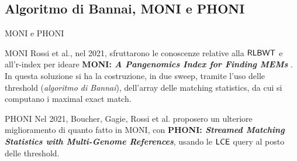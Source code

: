 \documentclass{beamer}
\def\LCE{\mbox{\rm {\sf LCE}}}
\def\RLBWT{\mbox{\rm {\sf RLBWT}}}
\def\LCE{\mbox{\rm {\sf LCE}}}
\begin{document}
\subsection{Algoritmo di Bannai, MONI e PHONI}
\begin{frame}{MONI e PHONI}
  \begin{block}{MONI}
    \small
    Rossi et al., nel 2021, sfruttarono le conoscenze relative
    alla $\RLBWT$ e all'r-index 
    per ideare \textbf{MONI:\textit{ A Pangenomics Index for Finding MEMs}}
    \cite{moni}. In questa soluzione si ha la costruzione, in due
    sweep, tramite l'uso delle threshold (\textit{algoritmo di
      Bannai}), dell'array delle matching statistics, da cui si computano i
    maximal exact match. 
  \end{block}
  \pause
  \begin{block}{PHONI}
    \small
    Nel 2021, Boucher, Gagie, Rossi et al. proposero un ulteriore miglioramento di
    quanto fatto in MONI, con \textbf{PHONI: \textit{Streamed Matching
        Statistics with Multi-Genome References}}\cite{phoni}, usando le
    $\LCE$ query 
    al posto delle threshold.
  \end{block}
\end{frame}
\end{document}
